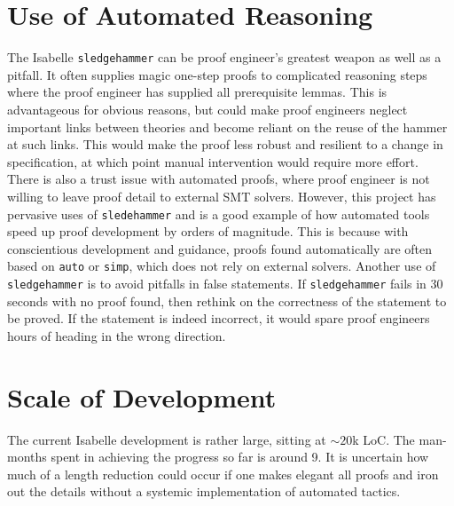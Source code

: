 \section{Use of Automated Reasoning}
The Isabelle \texttt{sledgehammer} can be proof engineer's greatest weapon as well as a pitfall. It often supplies magic one-step proofs to complicated reasoning steps where the proof engineer has supplied all prerequisite lemmas. This is advantageous for obvious reasons, but could make proof engineers neglect important links between theories and become reliant on the reuse of the hammer at such links. This would make the proof less robust and resilient to a change in specification, at which point manual intervention would require more effort. There is also a trust issue with automated proofs, where proof engineer is not willing to leave proof detail to external SMT solvers. However, this project has pervasive uses of \texttt{sledehammer} and is a good example of how automated tools speed up proof development by orders of magnitude. This is because with conscientious development and guidance, proofs found automatically are often based on \texttt{auto} or \texttt{simp}, which does not rely on external solvers. Another use of \texttt{sledgehammer} is to avoid pitfalls in false statements. If \texttt{sledgehammer} fails in 30 seconds with no proof found, then rethink on the correctness of the statement to be proved. If the statement is indeed incorrect, it would spare proof engineers hours of heading in the wrong direction.

\section{Scale of Development}
The current Isabelle development is rather large, sitting at $\sim 20$k LoC. The man-months spent in achieving the progress so far is around 9. It is uncertain how much of a length reduction could occur if one makes elegant all proofs and iron out the details without a systemic implementation of automated tactics.